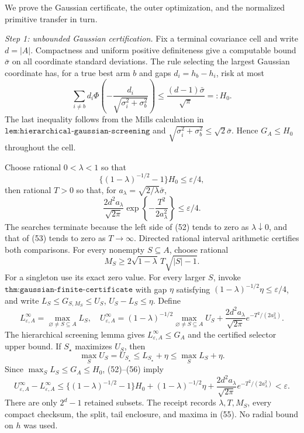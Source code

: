 We prove the Gaussian certificate, the outer optimization, and the normalized primitive transfer in turn.

\emph{Step 1: unbounded Gaussian certification.}
Fix a terminal covariance cell and write \(d=|A|\).  Compactness and uniform positive definiteness give a computable bound \(\bar\sigma\) on all coordinate standard deviations.  The rule selecting the largest Gaussian coordinate has, for a true best arm \(b\) and gaps \(d_i=h_b-h_i\), risk at most
\[
\sum_{i\ne b}d_i\Phi\!\left(-\frac{d_i}{\sqrt{\sigma_i^2+\sigma_b^2}}\right)
\leq\frac{(d-1)\bar\sigma}{\sqrt\pi}=:H_0. \tag{51}
\]
The last inequality follows from the Mills calculation in \(\texttt{lem:hierarchical-gaussian-screening}\) and \(\sqrt{\sigma_i^2+\sigma_b^2}\leq\sqrt2\bar\sigma\).  Hence \(G_A\leq H_0\) throughout the cell.

Choose rational \(0<\lambda<1\) so that
\[
\{(1-\lambda)^{-1/2}-1\}H_0\leq\varepsilon/4, \tag{52}
\]
then rational \(T>0\) so that, for \(a_\lambda=\sqrt{2/\lambda}\bar\sigma\),
\[
\frac{2d^2a_\lambda}{\sqrt{2\pi}}
\exp\!\left\{-\frac{T^2}{2a_\lambda^2}\right\}\leq\varepsilon/4. \tag{53}
\]
The searches terminate because the left side of (52) tends to zero as \(\lambda\downarrow0\), and that of (53) tends to zero as \(T\to\infty\).  Directed rational interval arithmetic certifies both comparisons.  For every nonempty \(S\subseteq A\), choose rational
\[
M_S\geq2\sqrt{1-\lambda}\,T\sqrt{|S|-1}. \tag{54}
\]
For a singleton use its exact zero value.  For every larger \(S\), invoke \(\texttt{thm:gaussian-finite-certificate}\) with gap \(\eta\) satisfying \((1-\lambda)^{-1/2}\eta\leq\varepsilon/4\), and write \(L_S\leq G_{S,M_S}\leq U_S\), \(U_S-L_S\leq\eta\).  Define
\[
L^{\infty}_{\varepsilon,A}=\max_{\varnothing\ne S\subseteq A}L_S,
\quad
U^{\infty}_{\varepsilon,A}=(1-\lambda)^{-1/2}
\max_{\varnothing\ne S\subseteq A}U_S
+\frac{2d^2a_\lambda}{\sqrt{2\pi}}e^{-T^2/(2a_\lambda^2)}. \tag{55}
\]
The hierarchical screening lemma gives \(L^{\infty}_{\varepsilon,A}\leq G_A\) and the certified selector upper bound.  If \(S_\star\) maximizes \(U_S\), then
\[
\max_SU_S=U_{S_\star}\leq L_{S_\star}+\eta\leq\max_SL_S+\eta. \tag{56}
\]
Since \(\max_SL_S\leq G_A\leq H_0\), (52)--(56) imply
\[
U^{\infty}_{\varepsilon,A}-L^{\infty}_{\varepsilon,A}
\leq\{(1-\lambda)^{-1/2}-1\}H_0
+(1-\lambda)^{-1/2}\eta
+\frac{2d^2a_\lambda}{\sqrt{2\pi}}e^{-T^2/(2a_\lambda^2)}
<\varepsilon. \tag{57}
\]
There are only \(2^d-1\) retained subsets.  The receipt records \(\lambda,T,M_S\), every compact checksum, the split, tail enclosure, and maxima in (55).  No radial bound on \(h\) was used.

